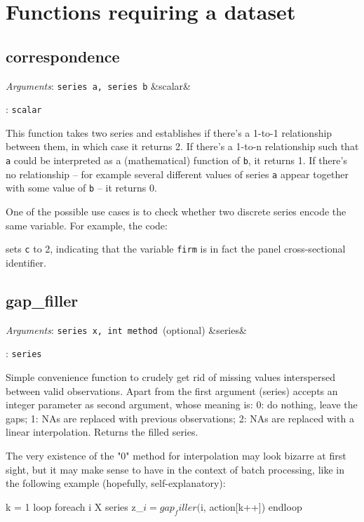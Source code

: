 \documentclass[11pt,english]{article}
\newcommand{\ArgRet}[2]{%
  {\it Arguments}: {#1}%
  \ifx&#2&%
  \else
  \par\smallskip\noindent {\it Return type}: \texttt{#2}
  \fi%
  \par\medskip\par%
  }
\begin{document}

\section{Functions requiring a dataset}

\subsection{correspondence}

\ArgRet{\texttt{series a, series b}}{scalar}

This function takes two series and establishes if there's a 1-to-1
relationship between them, in which case it returns 2.  If there's a
1-to-n relationship such that \texttt{a} could be interpreted as a (mathematical)
function of \texttt{b}, it returns 1. If there's no relationship -- for example several
different values of series \texttt{a} appear together with some value of \texttt{b} -- it
returns 0. 

One of the possible use cases is to check whether two
discrete series encode the same variable. For example, the code:
sets \texttt{c} to 2, indicating that the variable \texttt{firm} is in
fact the panel cross-sectional identifier.

\subsection{gap\_filler}

\ArgRet{\texttt{series x, int method }(optional)}{series}

Simple convenience function to crudely get rid of missing values
interspersed between valid observations. Apart from the first argument
(series) accepts an integer parameter as second argument, whose
meaning is: 0: do nothing, leave the gaps; 1: NAs are replaced with
previous observations; 2: NAs are replaced with a linear
interpolation. Returns the filled series.

The very existence of the "0" method for interpolation may look
bizarre at first sight, but it may make sense to have in the context
of batch processing, like in the following example (hopefully,
self-explanatory):
\begin{code}
k = 1
loop foreach i X
   series z_$i = gap_filler($i, action[k++])
endloop
\end{code}
\end{document}
